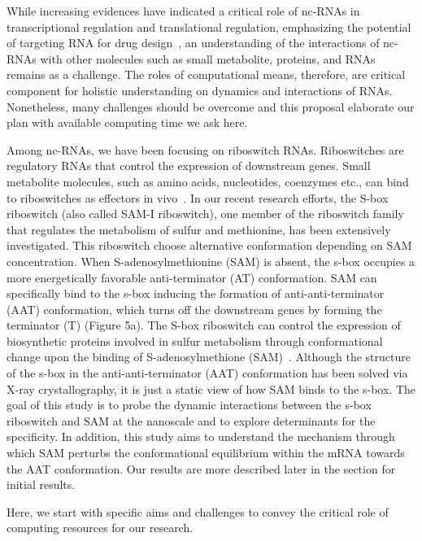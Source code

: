 \documentclass[a4paper,10pt]{article}
\begin{document}

While increasing evidences have indicated a critical role of nc-RNAs in transcriptional regulation and
translational regulation, emphasizing the potential of targeting RNA for drug
design~\cite{foloppe}, an understanding of the interactions of nc-RNAs with other molecules such as small metabolite, proteins, and RNAs remains as a challenge.  The roles of computational means, therefore, are critical component for holistic understanding on dynamics and interactions of RNAs.  Nonetheless, many challenges should be overcome and this proposal elaborate our plan with available computing time we ask here.

Among nc-RNAs, we have been focusing on riboswitch RNAs. Riboswitches are regulatory RNAs that control the expression of downstream genes. Small metabolite 
molecules, such as amino acids, nucleotides, coenzymes etc., can bind to riboswitches as effectors in  vivo~\cite{mandal}. 
In our recent research efforts, the S-box riboswitch (also called SAM-I riboswitch), one member of the riboswitch family that
regulates the metabolism of sulfur and methionine, has been extensively investigated.  This riboswitch choose alternative conformation depending on SAM concentration.  When S-adenosylmethionine (SAM) is absent, the
s-box occupies a more energetically favorable anti-terminator (AT) conformation. SAM can
specifically bind to the s-box inducing the formation of anti-anti-terminator (AAT) conformation,
which turns off the downstream genes by forming the terminator (T) (Figure 5a).
The S-box riboswitch can control the expression of biosynthetic proteins involved in sulfur metabolism 
through conformational change upon the binding of S-adenosylmethione (SAM)~\cite{brooke}. Although the 
structure of the s-box in the anti-anti-terminator (AAT) conformation has been solved via X-ray 
crystallography, it is just a static view of how SAM binds to the s-box. The goal of this study is to probe 
the dynamic interactions between the s-box riboswitch and SAM at the nanoscale and to explore 
determinants for the specificity. In addition, this study aims to understand the mechanism through which 
SAM perturbs the conformational equilibrium within the mRNA towards the AAT conformation. Our results are more described later in the section for initial results.

Here, we start with specific aims and challenges to convey the critical role of computing resources for our research.
\end{document}
